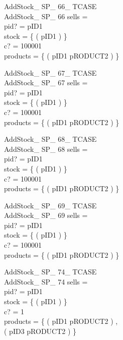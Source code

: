 \documentclass[fleqn,colorlinks,linkcolor=blue,citecolor=blue,urlcolor=blue]{article}
\newcommand{\negate}[0]{-}
\begin{document}
\begin{multicols}{2}
\begin{schema}{AddStock\_ SP\_ 66\_ TCASE}\\
 AddStock\_ SP\_ 66
\where
 sells =~\emptyset \\
 pid? = pID1 \\
 stock = \{ ( pID1  ) \} \\
 c? = 100001 \\
 products = \{ ( pID1 \mapsto pRODUCT2 ) \}
\end{schema}


\begin{schema}{AddStock\_ SP\_ 67\_ TCASE}\\
 AddStock\_ SP\_ 67
\where
 sells =~\emptyset \\
 pid? = pID1 \\
 stock = \{ ( pID1  ) \} \\
 c? = 100001 \\
 products = \{ ( pID1 \mapsto pRODUCT2 ) \}
\end{schema}


\begin{schema}{AddStock\_ SP\_ 68\_ TCASE}\\
 AddStock\_ SP\_ 68
\where
 sells =~\emptyset \\
 pid? = pID1 \\
 stock = \{ ( pID1  ) \} \\
 c? = 100001 \\
 products = \{ ( pID1 \mapsto pRODUCT2 ) \}
\end{schema}


\begin{schema}{AddStock\_ SP\_ 69\_ TCASE}\\
 AddStock\_ SP\_ 69
\where
 sells =~\emptyset \\
 pid? = pID1 \\
 stock = \{ ( pID1  ) \} \\
 c? = 100001 \\
 products = \{ ( pID1 \mapsto pRODUCT2 ) \}
\end{schema}


\begin{schema}{AddStock\_ SP\_ 74\_ TCASE}\\
 AddStock\_ SP\_ 74
\where
 sells =~\emptyset \\
 pid? = pID1 \\
 stock = \{ ( pID1 \mapsto \negate 4294967296 ) \} \\
 c? = 1 \\
 products = \{ ( pID1 \mapsto pRODUCT2 ) , \\ ( pID3 \mapsto pRODUCT2 ) \}
\end{schema}



\end{multicols}
\end{document}
